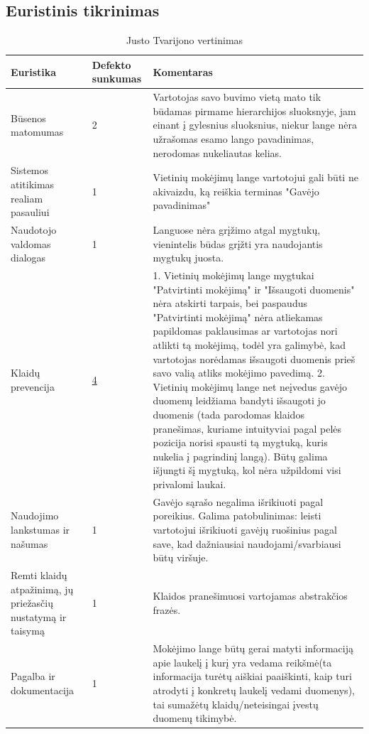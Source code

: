 \documentclass[oneside]{VUMIFPSkursinis}
\begin{document}
\subsection{Euristinis tikrinimas}
\begin{center}
\begin{longtable}[!htb]{|p{3.5cm}|p{1.9cm}|p{9.6cm}|}
	\caption{Justo Tvarijono vertinimas}
	\endfirsthead
	\endhead
  \hline
	Euristika & Defekto sunkumas & Komentaras \\ \hline
	Būsenos matomumas & 2 & Vartotojas savo buvimo vietą mato tik būdamas pirmame hierarchijos sluoksnyje, jam einant į gylesnius sluoksnius, niekur lange nėra užrašomas esamo lango pavadinimas, nerodomas nukeliautas kelias. \\ \hline
	Sistemos atitikimas realiam pasauliui & 1 & Vietinių mokėjimų lange vartotojui gali būti ne akivaizdu, ką reiškia terminas "Gavėjo pavadinimas" \\ \hline
	Naudotojo valdomas dialogas & 1 & Languose nėra grįžimo atgal mygtukų, vienintelis būdas grįžti yra naudojantis mygtukų juosta. \\ \hline
	Klaidų prevencija \label{lentele:klaiduPrevencijaJ} & \hyperref[fig:klaiduPrevencijaMygtukai]{4} & 1. Vietinių mokėjimų lange mygtukai "Patvirtinti mokėjimą" ir "Išsaugoti duomenis" nėra atskirti tarpais, bei paspaudus "Patvirtinti mokėjimą" nėra atliekamas papildomas paklausimas ar vartotojas nori atlikti tą mokėjimą, todėl yra galimybė, kad vartotojas norėdamas išsaugoti duomenis prieš savo valią atliks mokėjimo pavedimą. 2. Vietinių mokėjimų lange net neįvedus gavėjo duomenų leidžiama bandyti išsaugoti jo duomenis (tada parodomas klaidos pranešimas, kuriame intuityviai pagal pelės pozicija norisi spausti tą mygtuką, kuris nukelia į pagrindinį langą). Būtų galima išjungti šį mygtuką, kol nėra užpildomi visi privalomi laukai. \\ \hline
	Naudojimo lankstumas ir našumas & 1 & Gavėjo sąrašo negalima išrikiuoti pagal poreikius. Galima patobulinimas: leisti vartotojui išrikiuoti gavėjų ruošinius pagal save, kad dažniausiai naudojami/svarbiausi būtų viršuje. \\ \hline
	Remti klaidų atpažinimą, jų priežasčių nustatymą ir taisymą & 1 & Klaidos pranešimuosi vartojamas abstrakčios frazės. \\ \hline
	Pagalba ir dokumentacija & 1 & Mokėjimo lange būtų gerai matyti informaciją apie laukelį į kurį yra vedama reikšmė(ta informacija turėtų aiškiai paaiškinti, kaip turi atrodyti į konkretų laukelį vedami duomenys), tai sumažėtų klaidų/neteisingai įvestų duomenų tikimybė.  \\ \hline
\end{longtable}
\end{center}
\end{document}
